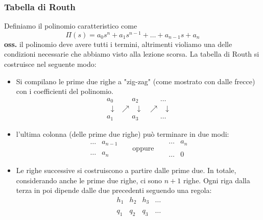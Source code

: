 \subsubsection*{Tabella di Routh}
Definiamo il polinomio caratteristico come
\[
    \Pi(s) = a_0s^n + a_1 s^{n-1} + \dots + a_{n-1}s + a_n
\]
\textbf{oss.} il polinomio deve avere tutti i termini, altrimenti violiamo una delle condizioni necessarie che abbiamo visto alla lezione scorsa.\newline
\newline
La tabella di Routh si costruisce nel seguente modo:
\begin{itemize}
    \item Si compilano le prime due righe a "zig-zag" (come mostrato con dalle frecce) con i coefficienti del polinomio.
    \[
        \begin{matrix}
            a_0 & \;\;\;\;\;\; a_2 & \;\;\;\;\;\;\dots\\
            \;\;\downarrow & \nearrow \;\; \downarrow & \nearrow \;\; \downarrow\\
            a_1 & \;\;\;\;\;\; a_3 & \;\;\;\;\;\;\dots 
        \end{matrix}
    \]
    \item l'ultima colonna (delle prime due righe) può terminare in due modi:
    \[
        \begin{matrix}
            \dots & a_{n-1}\\
            \;\\
            \dots & a_n
        \end{matrix}\;\;\;\;\;\; \text{oppure}\;\;\;\;\;\; \begin{matrix}
            \dots &a_n\\
            \;\\
            \dots & 0 
        \end{matrix}
    \]
    \item Le righe successive si costruiscono a partire dalle prime due.\newline
    In totale, considerando anche le prime due righe, ci sono $n+1$ righe.\newline
    Ogni riga dalla terza in poi dipende dalle due precedenti seguendo una regola:
    \[
        \begin{matrix}
            h_1 & h_2 & h_3 &\dots\\
            \;\\
            q_1 & q_2 & q_3 & \dots\\
            \;\\

\end{matrix}\]
\end{itemize}
